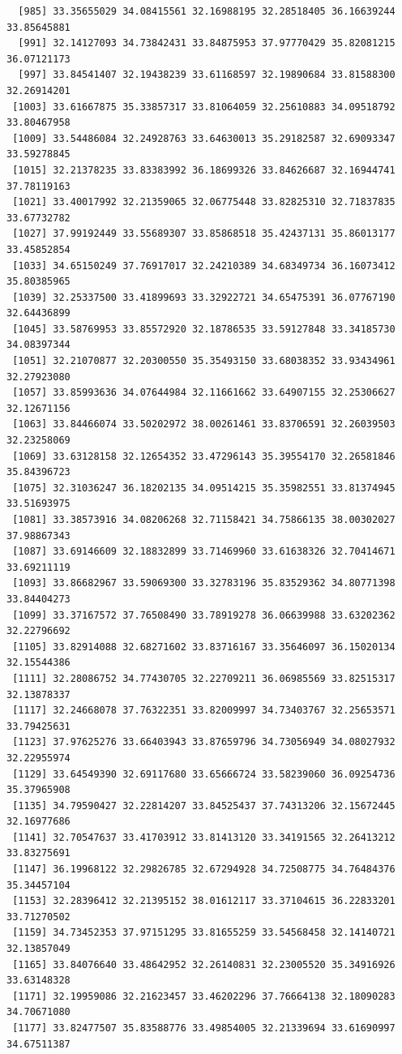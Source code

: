 \documentclass[
  letterpaper,
  DIV=11,
  numbers=noendperiod]{scrartcl}
\begin{document}
\begin{verbatim}
  [985] 33.35655029 34.08415561 32.16988195 32.28518405 36.16639244 33.85645881
  [991] 32.14127093 34.73842431 33.84875953 37.97770429 35.82081215 36.07121173
  [997] 33.84541407 32.19438239 33.61168597 32.19890684 33.81588300 32.26914201
 [1003] 33.61667875 35.33857317 33.81064059 32.25610883 34.09518792 33.80467958
 [1009] 33.54486084 32.24928763 33.64630013 35.29182587 32.69093347 33.59278845
 [1015] 32.21378235 33.83383992 36.18699326 33.84626687 32.16944741 37.78119163
 [1021] 33.40017992 32.21359065 32.06775448 33.82825310 32.71837835 33.67732782
 [1027] 37.99192449 33.55689307 33.85868518 35.42437131 35.86013177 33.45852854
 [1033] 34.65150249 37.76917017 32.24210389 34.68349734 36.16073412 35.80385965
 [1039] 32.25337500 33.41899693 33.32922721 34.65475391 36.07767190 32.64436899
 [1045] 33.58769953 33.85572920 32.18786535 33.59127848 33.34185730 34.08397344
 [1051] 32.21070877 32.20300550 35.35493150 33.68038352 33.93434961 32.27923080
 [1057] 33.85993636 34.07644984 32.11661662 33.64907155 32.25306627 32.12671156
 [1063] 33.84466074 33.50202972 38.00261461 33.83706591 32.26039503 32.23258069
 [1069] 33.63128158 32.12654352 33.47296143 35.39554170 32.26581846 35.84396723
 [1075] 32.31036247 36.18202135 34.09514215 35.35982551 33.81374945 33.51693975
 [1081] 33.38573916 34.08206268 32.71158421 34.75866135 38.00302027 37.98867343
 [1087] 33.69146609 32.18832899 33.71469960 33.61638326 32.70414671 33.69211119
 [1093] 33.86682967 33.59069300 33.32783196 35.83529362 34.80771398 33.84404273
 [1099] 33.37167572 37.76508490 33.78919278 36.06639988 33.63202362 32.22796692
 [1105] 33.82914088 32.68271602 33.83716167 33.35646097 36.15020134 32.15544386
 [1111] 32.28086752 34.77430705 32.22709211 36.06985569 33.82515317 32.13878337
 [1117] 32.24668078 37.76322351 33.82009997 34.73403767 32.25653571 33.79425631
 [1123] 37.97625276 33.66403943 33.87659796 34.73056949 34.08027932 32.22955974
 [1129] 33.64549390 32.69117680 33.65666724 33.58239060 36.09254736 35.37965908
 [1135] 34.79590427 32.22814207 33.84525437 37.74313206 32.15672445 32.16977686
 [1141] 32.70547637 33.41703912 33.81413120 33.34191565 32.26413212 33.83275691
 [1147] 36.19968122 32.29826785 32.67294928 34.72508775 34.76484376 35.34457104
 [1153] 32.28396412 32.21395152 38.01612117 33.37104615 36.22833201 33.71270502
 [1159] 34.73452353 37.97151295 33.81655259 33.54568458 32.14140721 32.13857049
 [1165] 33.84076640 33.48642952 32.26140831 32.23005520 35.34916926 33.63148328
 [1171] 32.19959086 32.21623457 33.46202296 37.76664138 32.18090283 34.70671080
 [1177] 33.82477507 35.83588776 33.49854005 32.21339694 33.61690997 34.67511387

\end{verbatim}
\end{document}
